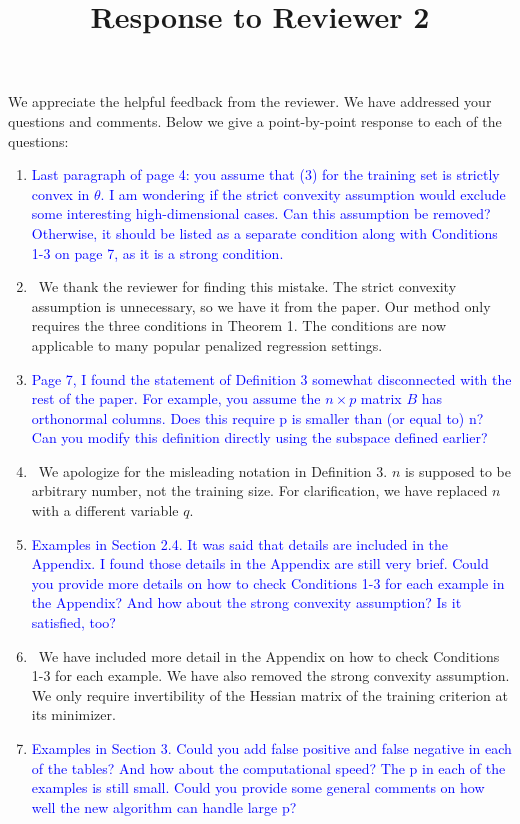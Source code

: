 \documentclass[]{article}
\title{Response to Reviewer 2}
\newcommand{\point}[1]{\item \textcolor{blue}{#1}}
\newcommand{\reply}{\item[]\ }
\begin{document}
	\maketitle
		
	We appreciate the helpful feedback from the reviewer. We have addressed your questions and comments. Below we give a point-by-point response to each of the questions:
		
	\begin{enumerate}
		\point{Last paragraph of page 4: you assume that (3) for the training set is strictly convex in $\theta$. I am wondering if the strict convexity assumption would exclude some interesting high-dimensional cases. Can this assumption be removed? Otherwise, it should be listed as a separate condition along with Conditions 1-3 on page 7, as it is a strong condition.}
		
		\reply We thank the reviewer for finding this mistake. The strict convexity assumption is unnecessary, so we have it from the paper. Our method only requires the three conditions in Theorem 1. The conditions are now applicable to many popular penalized regression settings.
		
		\point{Page 7, I found the statement of Definition 3 somewhat disconnected with the rest of the paper. For example, you assume the $n\times p$ matrix $B$ has orthonormal columns. Does this require p is smaller than (or equal to) n? Can you modify this definition directly using the subspace defined earlier?}
		
		\reply We apologize for the misleading notation in Definition 3. $n$ is supposed to be arbitrary number, not the training size. For clarification, we have replaced $n$ with a different variable $q$. 
		
		
		\point{Examples in Section 2.4. It was said that details are included in the Appendix. I found those details in the Appendix are still very brief. Could you provide more details on how to check Conditions 1-3 for each example in the Appendix? And how about the strong convexity assumption? Is it satisfied, too?}
		
		\reply We have included more detail in the Appendix on how to check Conditions 1-3 for each example. We have also removed the strong convexity assumption. We only require invertibility of the Hessian matrix of the training criterion at its minimizer.
		
		\point{Examples in Section 3. Could you add false positive and false negative in each of the tables? And how about the computational speed? The p in each of the examples is still small. Could you provide some general comments on how well the new algorithm can handle large p?}
		

\end{enumerate}
\end{document}
